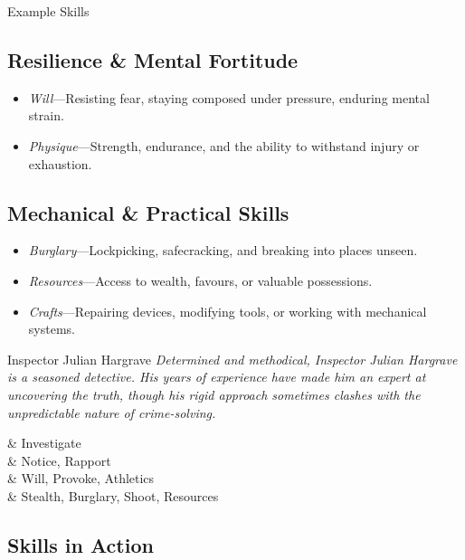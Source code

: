 \begin{WyrdExampleSidebar}[float=!t]{Example Skills}
	\subsection*{Resilience \& Mental Fortitude}  
	\begin{itemize}
    	\item \emph{Will}---Resisting fear, staying composed under pressure, enduring mental strain.
	    \item \emph{Physique}---Strength, endurance, and the ability to withstand injury or exhaustion.
	\end{itemize}

	\subsection*{Mechanical \& Practical Skills}  
	\begin{itemize}
    	\item \emph{Burglary}---Lockpicking, safecracking, and breaking into places unseen.
	    \item \emph{Resources}---Access to wealth, favours, or valuable possessions.
	    \item \emph{Crafts}---Repairing devices, modifying tools, or working with mechanical systems.
	\end{itemize}
\end{WyrdExampleSidebar}

\begin{WyrdNPC}[float=!t]{Inspector Julian Hargrave}
	\emph{Determined and methodical, Inspector Julian Hargrave is a seasoned detective. His years of experience have made him an expert at uncovering the truth, though his rigid approach sometimes clashes with the unpredictable nature of crime-solving.}

	\vspace{0.5\baselineskip}
	\begin{SkillsBox}
		\Expert & Investigate \\
		\Skilled & Notice, Rapport \\
		\Novice & Will, Provoke, Athletics \\
		\Untrained & Stealth, Burglary, Shoot, Resources \\
	\end{SkillsBox}

\end{WyrdNPC}

\clearpage



\subsection{Skills in Action}

